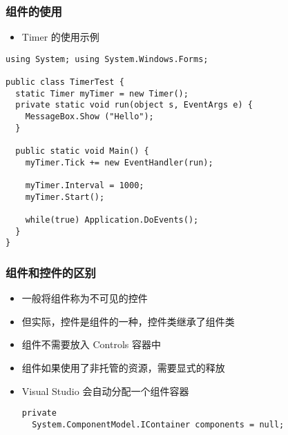 \begin{frame}[fragile]
\frametitle{组件的使用}
\begin{itemize}
\item Timer 的使用示例
\end{itemize}
\begin{lstlisting}
using System; using System.Windows.Forms;

public class TimerTest {
  static Timer myTimer = new Timer();
  private static void run(object s, EventArgs e) {
    MessageBox.Show ("Hello");
  }
 
  public static void Main() {
    myTimer.Tick += new EventHandler(run);
 
    myTimer.Interval = 1000;
    myTimer.Start();
 
    while(true) Application.DoEvents();
  }
}
\end{lstlisting}
\end{frame}

\begin{frame}[fragile]
\frametitle{组件和控件的区别}
\begin{itemize}
\setlength{\itemsep}{6pt plus 1pt}
\item 一般将组件称为不可见的控件
\item 但实际，控件是组件的一种，控件类继承了组件类
\item 组件不需要放入 Controls 容器中
\item 组件如果使用了非托管的资源，需要显式的释放
\item Visual Studio 会自动分配一个组件容器
\begin{lstlisting}
private
  System.ComponentModel.IContainer components = null;
\end{lstlisting}
\end{itemize}
\end{frame}


